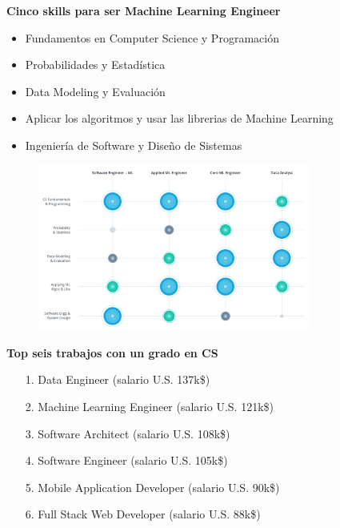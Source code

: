 \documentclass[english,svgnames,notes=hide,12pt]{beamer}
\begin{document}
\begin{frame}
    \textbf{Cinco skills para ser Machine Learning Engineer}
    \begin{itemize}
        \item Fundamentos en Computer Science y Programaci\'on
        \item Probabilidades y Estad\'istica
        \item Data Modeling y Evaluaci\'on
        \item Aplicar los algoritmos y usar las librerias de Machine Learning
        \item Ingenier\'ia de Software y Dise\~no de Sistemas
    \end{itemize}
\end{frame}

\begin{frame}
    \begin{figure}
        \includegraphics[width=0.8\textwidth]{imgs/cs-skills.png}
    \end{figure}
\end{frame}

\begin{frame}
    \textbf{Top seis trabajos con un grado en CS}
    \begin{itemize}
        \item[\small{1.}] Data Engineer (salario U.S. 137k\$)
        \item[\small{2.}] Machine Learning Engineer (salario U.S. 121k\$)
        \item[\small{3.}] Software Architect (salario U.S. 108k\$)
        \item[\small{4.}] Software Engineer (salario U.S. 105k\$)
        \item[\small{5.}] Mobile Application Developer (salario U.S. 90k\$)
        \item[\small{6.}] Full Stack Web Developer (salario U.S. 88k\$)
    \end{itemize}

\end{frame}
\end{document}
